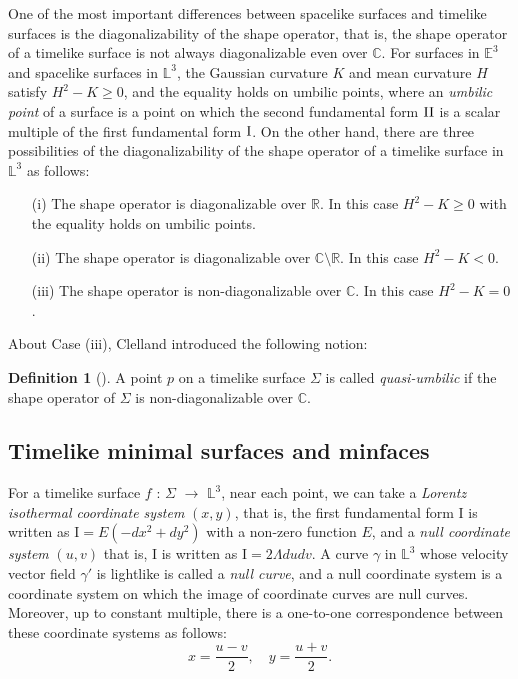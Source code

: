 \documentclass[11pt,reqno]{amsart}
\theoremstyle{plain} %
\theoremstyle{definition}
\newtheorem{definition}[theorem]{Definition}
\begin{document}
One of the most important differences between spacelike surfaces and timelike surfaces is the diagonalizability of the shape operator, that is, the shape operator of a timelike surface is not always diagonalizable even over $\mathbb{C}$. For surfaces in $\mathbb{E}^3$ and spacelike surfaces in $\mathbb{L}^3$, the Gaussian curvature $K$ and mean curvature $H$ satisfy $H^2 -K \geq 0$, and the equality holds on umbilic points, where an {\it umbilic point} of a surface is a point on which the second fundamental form ${\rm II}$ is a scalar multiple of the first fundamental form ${\rm I}$. On the other hand, there are three possibilities of the diagonalizability of the shape operator of a timelike surface in $\mathbb{L}^3$ as follows:
 \begin{enumerate}
\item[(i)] The shape operator is diagonalizable over $\mathbb{R}$. In this case $H^2 - K \geq 0$ with the equality holds on umbilic points.
\item[(ii)] The shape operator is diagonalizable over $\mathbb{C}\setminus \mathbb{R}$. In this case $H^2 - K < 0$. 
\item[(iii)] The shape operator is non-diagonalizable over $\mathbb{C}$. In this case $H^2 - K = 0$.
\end{enumerate}
About Case (iii), Clelland \cite{Clelland} introduced the following notion:
\begin{definition}[\cite{Clelland}]\label{def:quasi-umbilic}
A point $p$ on a timelike surface $\Sigma$ is called {\it quasi-umbilic} if the shape operator of $\Sigma$ is non-diagonalizable over $\mathbb{C}$. %
\end{definition}

\subsection{Timelike minimal surfaces and minfaces\label{preliminary2}}
 For a timelike surface $f$ : $\Sigma $ $\longrightarrow$ $\mathbb{L}^3$, near each point, we can take a {\it Lorentz isothermal coordinate system} $(x,y)$, that is, the first fundamental form $\mathrm{I}$ is written as $\mathrm{I}=E(-dx^2+dy^2)$ with a non-zero function $E$, and a {\it null coordinate system} $(u,v)$ that is, $\mathrm{I}$ is written as $\mathrm{I}=2\Lambda dudv$. A curve $\gamma$ in $\mathbb{L}^3$ %
 whose velocity vector field $\gamma'$ is lightlike is called a {\it null curve}, and a null coordinate system is a coordinate system on which the image of coordinate curves are null curves. Moreover, up to constant multiple, there is a one-to-one correspondence between these coordinate systems as follows:
 \begin{equation*}
 x=\frac{u-v}{2},\quad y=\frac{u+v}{2}.
\end{equation*}
 
\end{document}
